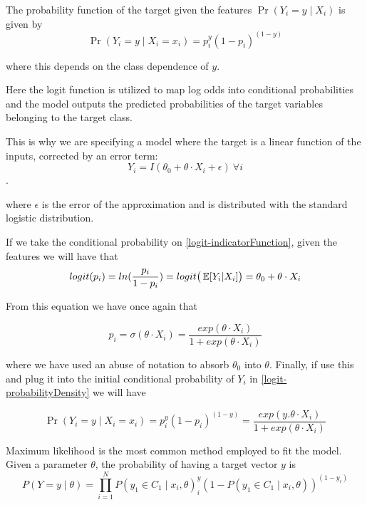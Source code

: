 The probability function of the target given the features $\Pr(Y_i=y\mid X_i)$ is given by
\begin{equation}
\Pr(Y_i=y \mid X_i = x_i) = p_i^{y} (1-p_i)^{(1-y)}
\end{equation}\label{logit-probabilityDensity}

where this depends on the class dependence of $y$.

Here the logit function is utilized to map log odds into conditional probabilities and the model outputs the predicted probabilities of the target variables belonging to the target class.

This is why we are specifying a model where the target is a linear function of the inputs, corrected by an error term:
\begin{equation}
Y_i = I(\theta_0 + \theta \cdot X_i + \epsilon) \ \forall i
\end{equation}. \label{logit-indicatorFunction}

where $\epsilon$ is the error of the approximation and is distributed with the standard logistic distribution. %

If we take the conditional probability on \ref{logit-indicatorFunction}, given the features we will have that
\begin{equation}
logit(p_i)= ln(\frac{p_i}{1-p_i}) = logit\big( \operatorname{\mathbb{E}}[Y_i| X_i] \big) = \theta_0 + \theta \cdot X_i
\end{equation}

From this equation we have once again that

\begin{equation}
p_i = \sigma(\theta \cdot X_i) = \frac{exp(\theta \cdot X_i) }{1 + exp(\theta \cdot X_i)}
\end{equation}

where we have used an abuse of notation to absorb $\theta_0$ into $\theta$. Finally, if use this and plug it into the initial conditional probability of $Y_i$ in \ref{logit-probabilityDensity} we will have

\begin{equation}
 \Pr(Y_i=y \mid X_i = x_i) =  p_i^{y} (1-p_i)^{(1-y)} = \frac{exp(y . \theta \cdot X_i) }{1 + exp(\theta \cdot X_i)}
 \end{equation}


Maximum likelihood is the most common method employed to fit the model. %
Given a parameter $\theta$, the probability of having a target vector $y$ is
\begin{equation}

P(Y =y \mid \theta )  = \prod_{i=1}^N P(y_1 \in C_1 \mid x_i, \theta)^y_i(1 - P(y_1 \in C_1 \mid x_i, \theta) )^{(1-y_i)}
\end{equation}

